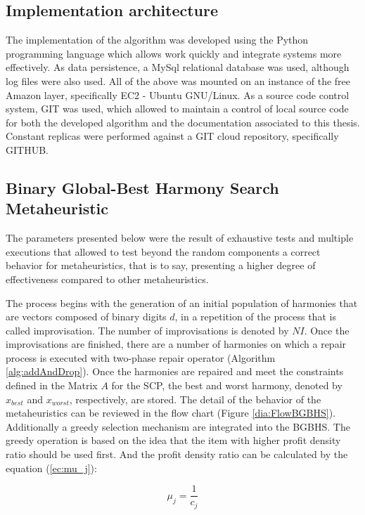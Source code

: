 \subsection{Implementation architecture}
The implementation of the algorithm was developed using the Python programming language which allows work quickly and integrate systems more effectively.
As data persistence, a MySql relational database was used, although log files were also used. All of the above was mounted on an instance of the free Amazon layer, specifically EC2 - Ubuntu GNU/Linux.
As a source code control system, GIT was used, which allowed to maintain a control of local source code for both the developed algorithm and the documentation associated to this thesis. Constant replicas were performed against a GIT cloud repository, specifically GITHUB.
 
\subsection{Binary Global-Best Harmony Search Metaheuristic}
The parameters presented below were the result of exhaustive tests and multiple executions that allowed to test beyond the random components a correct behavior for metaheuristics, that is to say, presenting a higher degree of effectiveness compared to other metaheuristics.

The process begins with the generation of an initial population of harmonies that are vectors composed of binary digits $d$, in a repetition of the process that is called improvisation. The number of improvisations is denoted by $NI$. Once the improvisations are finished, there are a number of harmonies on which a repair process is executed with two-phase repair operator (Algorithm \ref{alg:addAndDrop}). Once the harmonies are repaired and meet the constraints defined in the  Matrix $A$ for the SCP, the best and worst harmony, denoted by $x_ {best}$ and $x_ {worst}$, respectively, are stored. The detail of the behavior of the metaheuristics can be reviewed in the flow chart (Figure \ref{dia:FlowBGBHS}). Additionally a greedy selection mechanism are integrated into the BGBHS. The greedy operation is based on the idea that the item with higher profit density ratio should be used first. And the profit density ratio can be calculated by the equation (\ref{ec:mu_j}): 

\begin{equation} \label{ec:mu_j} 
\mu_{j}={\frac{1}{c_j}}
\end{equation}	
		

